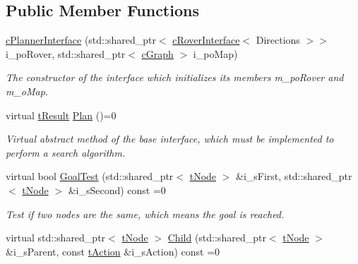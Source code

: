 \subsection*{Public Member Functions}
\begin{DoxyCompactItemize}
\item 
\mbox{\label{classplanner_1_1c_planner_interface_ae09e9120335fce8f331749f492255fca}} 
\mbox{\hyperlink{classplanner_1_1c_planner_interface_ae09e9120335fce8f331749f492255fca}{c\+Planner\+Interface}} (std\+::shared\+\_\+ptr$<$ \mbox{\hyperlink{classplanner_1_1c_rover_interface}{c\+Rover\+Interface}}$<$ Directions $>$$>$ i\+\_\+po\+Rover, std\+::shared\+\_\+ptr$<$ \mbox{\hyperlink{classplanner_1_1c_graph}{c\+Graph}} $>$ i\+\_\+po\+Map)
\begin{DoxyCompactList}\small\item\em The constructor of the interface which initializes its members m\+\_\+po\+Rover and m\+\_\+o\+Map. \end{DoxyCompactList}\item 
virtual \mbox{\hyperlink{structt_result}{t\+Result}} \mbox{\hyperlink{classplanner_1_1c_planner_interface_a7a06632a8c53906daf39611d9692ffa5}{Plan}} ()=0
\begin{DoxyCompactList}\small\item\em Virtual abstract method of the base interface, which must be implemented to perform a search algorithm. \end{DoxyCompactList}\item 
virtual bool \mbox{\hyperlink{classplanner_1_1c_planner_interface_afec836d58ce54c49046bf30ecdebbfec}{Goal\+Test}} (std\+::shared\+\_\+ptr$<$ \mbox{\hyperlink{structplanner_1_1t_node}{t\+Node}} $>$ \&i\+\_\+s\+First, std\+::shared\+\_\+ptr$<$ \mbox{\hyperlink{structplanner_1_1t_node}{t\+Node}} $>$ \&i\+\_\+s\+Second) const =0
\begin{DoxyCompactList}\small\item\em Test if two nodes are the same, which means the goal is reached. \end{DoxyCompactList}\item 
virtual std\+::shared\+\_\+ptr$<$ \mbox{\hyperlink{structplanner_1_1t_node}{t\+Node}} $>$ \mbox{\hyperlink{classplanner_1_1c_planner_interface_a7e2048c2a4c699a76db90d1cbfecf156}{Child}} (std\+::shared\+\_\+ptr$<$ \mbox{\hyperlink{structplanner_1_1t_node}{t\+Node}} $>$ \&i\+\_\+s\+Parent, const \mbox{\hyperlink{structplanner_1_1t_action}{t\+Action}} \&i\+\_\+s\+Action) const =0
$$
\end{DoxyCompactItemize}
